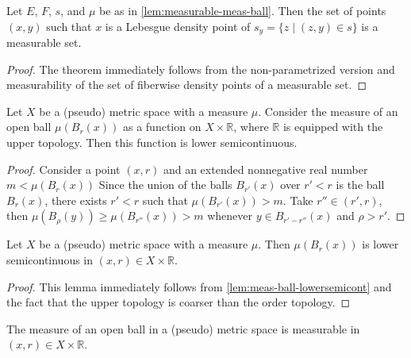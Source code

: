 \begin{corollary}%
  \label{cor:measurable-density}
  \leanok%
  Let \(E\), \(F\), \(s\), and \(\mu\) be as in \autoref{lem:measurable-meas-ball}.
  Then the set of points \((x, y)\) such that \(x\) is a Lebesgue density point of \(s_{y} = \{z \mid (z, y) \in s\}\)
  is a measurable set.
\end{corollary}
\begin{proof}
  \leanok%
  The theorem immediately follows from the non-parametrized version
  and measurability of the set of fiberwise density points of a measurable set.
\end{proof}

\begin{lemma}%
  \label{lem:meas-ball-lowersemicont}
  Let \(X\) be a (pseudo) metric space with a measure \(\mu\).
  Consider the measure of an open ball \(\mu(B_{r}(x))\) as a function on \(X\times\mathbb R\),
  where \(\mathbb R\) is equipped with the upper topology.
  Then this function is lower semicontinuous.
\end{lemma}

\begin{proof}
  Consider a point \((x, r)\) and an extended nonnegative real number \(m < \mu(B_{r}(x))\)
  Since the union of the balls \(B_{r'}(x)\) over \(r' < r\) is the ball \(B_{r}(x)\),
  there exists \(r' < r\) such that \(\mu\left(B_{r'}(x)\right) > m\).
  Take \(r'' \in (r', r)\), then \(\mu\left(B_{\rho}(y)\right) \ge \mu\left(B_{r''}(x)\right)> m\)
  whenever \(y\in B_{r' - r''}(x)\) and \(\rho > r'\).
\end{proof}

\begin{corollary}%
  \label{cor:meas-ball-lowersemicont}
  Let \(X\) be a (pseudo) metric space with a measure \(\mu\).
  Then \(\mu(B_{r}(x))\) is lower semicontinuous in \((x, r)\in X\times\mathbb R\).
\end{corollary}

\begin{proof}
  This lemma immediately follows from \autoref{lem:meas-ball-lowersemicont}
  and the fact that the upper topology is coarser than the order topology.
\end{proof}

\begin{corollary}%
  \label{cor:meas-ball-mesaurable}
  The measure of an open ball in a (pseudo) metric space is measurable in \((x, r)\in X\times\mathbb R\).
\end{corollary}

